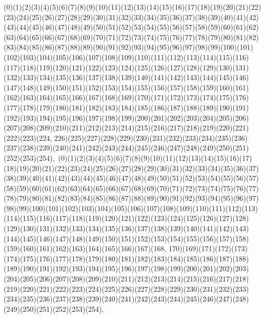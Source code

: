 \documentclass[12pt]{article}
\begin{document}
{(0)(1)(2)(3)(4)(5)(6)(7)(8)(9)(10)(11)(12)(13)(14)(15)(16)(17)(18)(19)(20)(21)(22)(23)(24)(25)(26)(27)(28)(29)(30)(31)(32)(33)(34)(35)(36)(37)(38)(39)(40)(41)(42)(43)(44)(45)(46)(47)(48)(49)(50)(51)(52)(53)(54)(55)(56)(57)(58)(59)(60)(61)(62)(63)(64)(65)(66)(67)(68)(69)(70)(71)(72)(73)(74)(75)(76)(77)(78)(79)(80)(81)(82)(83)(84)(85)(86)(87)(88)(89)(90)(91)(92)(93)(94)(95)(96)(97)(98)(99)(100)(101)(102)(103)(104)(105)(106)(107)(108)(109)(110)(111)(112)(113)(114)(115)(116)(117)(118)(119)(120)(121)(122)(123)(124)(125)(126)(127)(128)(129)(130)(131)(132)(133)(134)(135)(136)(137)(138)(139)(140)(141)(142)(143)(144)(145)(146)(147)(148)(149)(150)(151)(152)(153)(154)(155)(156)(157)(158)(159)(160)(161)(162)(163)(164)(165)(166)(167)(168)(169)(170)(171)(172)(173)(174)(175)(176)(177)(178)(179)(180)(181)(182)(183)(184)(185)(186)(187)(188)(189)(190)(191)(192)(193)(194)(195)(196)(197)(198)(199)(200)(201)(202)(203)(204)(205)(206)(207)(208)(209)(210)(211)(212)(213)(214)(215)(216)(217)(218)(219)(220)(221)(222)(223)(224, 226)(225)(227)(228)(229)(230)(231)(232)(233)(234)(235)(236)(237)(238)(239)(240)(241)(242)(243)(244)(245)(246)(247)(248)(249)(250)(251)(252)(253)(254)$
, 
$
(0)(1)(2)(3)(4)(5)(6)(7)(8)(9)(10)(11)(12)(13)(14)(15)(16)(17)(18)(19)(20)(21)(22)(23)(24)(25)(26)(27)(28)(29)(30)(31)(32)(33)(34)(35)(36)(37)(38)(39)(40)(41)(42)(43)(44)(45)(46)(47)(48)(49)(50)(51)(52)(53)(54)(55)(56)(57)(58)(59)(60)(61)(62)(63)(64)(65)(66)(67)(68)(69)(70)(71)(72)(73)(74)(75)(76)(77)(78)(79)(80)(81)(82)(83)(84)(85)(86)(87)(88)(89)(90)(91)(92)(93)(94)(95)(96)(97)(98)(99)(100)(101)(102)(103)(104)(105)(106)(107)(108)(109)(110)(111)(112)(113)(114)(115)(116)(117)(118)(119)(120)(121)(122)(123)(124)(125)(126)(127)(128)(129)(130)(131)(132)(133)(134)(135)(136)(137)(138)(139)(140)(141)(142)(143)(144)(145)(146)(147)(148)(149)(150)(151)(152)(153)(154)(155)(156)(157)(158)(159)(160)(161)(162)(163)(164)(165)(166)(167)(168, 170)(169)(171)(172)(173)(174)(175)(176)(177)(178)(179)(180)(181)(182)(183)(184)(185)(186)(187)(188)(189)(190)(191)(192)(193)(194)(195)(196)(197)(198)(199)(200)(201)(202)(203)(204)(205)(206)(207)(208)(209)(210)(211)(212)(213)(214)(215)(216)(217)(218)(219)(220)(221)(222)(223)(224)(225)(226)(227)(228)(229)(230)(231)(232)(233)(234)(235)(236)(237)(238)(239)(240)(241)(242)(243)(244)(245)(246)(247)(248)(249)(250)(251)(252)(253)(254)$
, 
$
}
\end{document}
